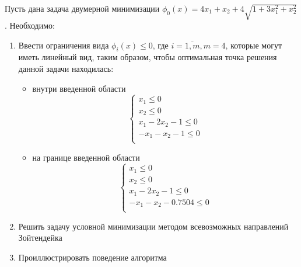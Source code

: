 \documentclass[../body.tex]{subfiles}
\begin{document}
Пусть дана задача двумерной минимизации $\phi_0(x)=4x_1+x_2+4\sqrt{1+3x_1^2+x_2^2}$. Необходимо:
\begin{enumerate}
    \item Ввести ограничения вида $\phi_i(x)\leq0$, где $i=\overline{1,m},m=4$, которые могут иметь линейный вид, таким образом, чтобы оптимальная точка решения данной задачи находилась:
        \begin{itemize}
            \item внутри введенной области
                \begin{equation}
                    \left\{
                    \begin{array}{ll}
                        x_1\leq0\\
                        x_2\leq0\\
                        x_1-2x_2-1\leq0\\
                        -x_1-x_2-1\leq0\\
                    \end{array}
                    \right.
                \end{equation}
            \item на границе введенной области                            \begin{equation}
                    \left\{
                    \begin{array}{ll}
                        x_1\leq0\\
                        x_2\leq0\\
                        x_1-2x_2-1\leq0\\
                        -x_1-x_2-0.7504\leq0\\
                    \end{array}
                    \right.
                \end{equation}
        \end{itemize}
    \item Решить задачу условной минимизации методом всевозможных направлений Зойтендейка
    \item Проиллюстрировать поведение алгоритма
\end{enumerate}
\end{document}
